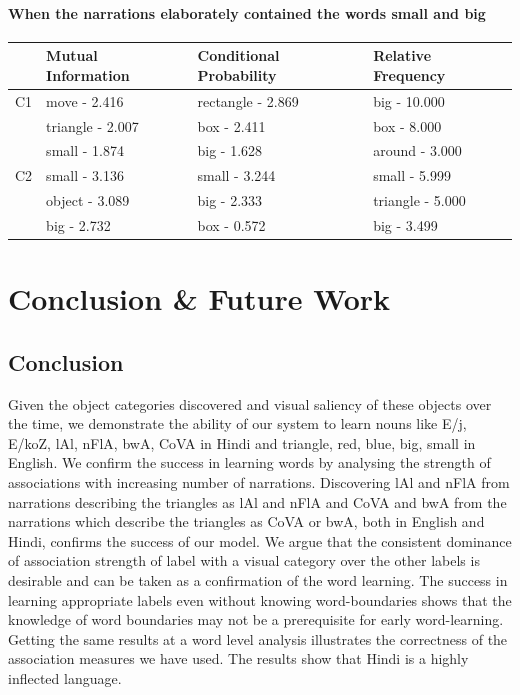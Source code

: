 \documentclass[12pt, a4paper]{report}
\begin{document}
\subsubsection{When the narrations elaborately contained the words \textbf{small} and \textbf{big}}
\vspace*{10px}
\begin{tabularx}{\textwidth}{ l | X | X | X }
& Mutual Information & Conditional Probability & Relative Frequency\\
\hline
C1  & move - 2.416 & rectangle - 2.869 & big - 10.000\\
& triangle - 2.007 & box - 2.411 & box - 8.000\\
& small - 1.874 & big - 1.628 & around - 3.000\\
\hline
C2 & small - 3.136 & small - 3.244 & small - 5.999\\
& object - 3.089 & big - 2.333 & triangle - 5.000\\
& big - 2.732 & box - 0.572 & big - 3.499\\
\end{tabularx}


\chapter{Conclusion \& Future Work}
\section{Conclusion}
Given the object categories discovered and visual saliency of these objects over the time, we demonstrate the ability of our system to learn nouns like {\dn E/j}, {\dn E/koZ}, {\dn lAl}, {\dn nFlA}, {\dn bwA}, {\dn CoVA} in Hindi and  triangle, red, blue, big, small in English. We confirm the success in learning words by analysing the strength of associations with increasing number of narrations. Discovering {\dn lAl} and {\dn nFlA} from narrations describing the triangles as {\dn lAl} and {\dn nFlA} and {\dn CoVA} and {\dn bwA} from the narrations which describe the triangles as {\dn CoVA} or {\dn bwA}, both in English and Hindi, confirms the success of our model. We argue that the consistent dominance of association strength of label with a visual category over the other labels is desirable and can be taken as a confirmation of the word learning. The success in learning appropriate labels even without knowing word-boundaries shows that the knowledge of word boundaries may not be a prerequisite for early word-learning. Getting the same results at a word level analysis illustrates the correctness of the association measures we have used. The results show that Hindi is a highly inflected language.
\end{document}
